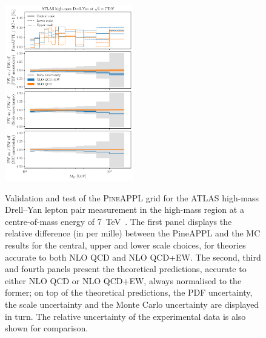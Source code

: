 \begin{figure}[!t]
    \centering
    \includegraphics[width=0.5\textwidth]{figures/pineappl_ATLASZHIGHMASS49FB}\\
    \caption{Validation and test of the \textsc{PineAPPL} grid for the ATLAS
      high-mass Drell--Yan lepton pair measurement in the high-mass region at
      a centre-of-mass energy of \SI{7}{\tera\electronvolt}~\cite{Aad:2013iua}. The first panel
      displays the relative difference (in per mille) between the {\sc PineAPPL}
      and the MC results for the central, upper and lower scale choices,
      for theories accurate to both NLO QCD and NLO QCD+EW. The second, third
      and fourth panels present the theoretical predictions, accurate to either
      NLO QCD or NLO QCD+EW, always normalised to the former; on top of the
      theoretical predictions, the PDF uncertainty, the scale uncertainty and
      the Monte Carlo uncertainty are displayed in turn. The relative
      uncertainty of the experimental data is also shown for comparison.}
    \label{fig:atlaszhighmass49fb}
\end{figure}

